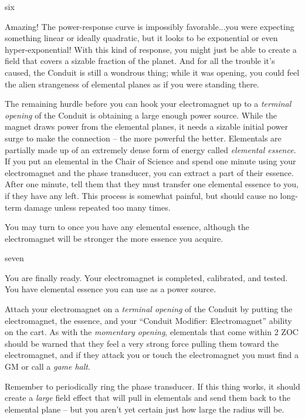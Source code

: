 \documentclass[notebook]{elementals}
\begin{document}
\begin{page}{six}

Amazing! The power-response curve is impossibly favorable...you were expecting something linear or ideally quadratic, but it looks to be exponential or even hyper-exponential! With this kind of response, you might just be able to create a field that covers a sizable fraction of the planet. And for all the trouble it's caused, the Conduit is still a wondrous thing; while it was opening, you could feel the alien strangeness of elemental planes as if you were standing there.

The remaining hurdle before you can hook your electromagnet up to a \emph{terminal opening} of the Conduit is obtaining a large enough power source. While the magnet draws power from the elemental planes, it needs a sizable initial power surge to make the connection -- the more powerful the better. Elementals are partially made up of an extremely dense form of energy called \emph{elemental essence}. If you put an elemental in the Chair of Science and spend one minute using your electromagnet and the phase transducer, you can extract a part of their essence. After one minute, tell them that they must transfer one elemental essence to you, if they have any left. This process is somewhat painful, but should cause no long-term damage unless repeated too many times.

You may turn to  once you have any elemental essence, although the electromagnet will be stronger the more essence you acquire.

\end{page}

\begin{page}{seven}

You are finally ready. Your electromagnet is completed, calibrated, and tested. You have elemental essence you can use as a power source.

Attach your electromagnet on a \emph{terminal opening} of the Conduit by putting the electromagnet, the essence, and your ``Conduit Modifier: Electromagnet'' ability on the cart. As with the \emph{momentary opening}, elementals that come within 2 ZOC should be warned that they feel a very strong force pulling them toward the electromagnet, and if they attack you or touch the electromagnet you must find a GM or call a \emph{game halt}.

Remember to periodically ring the phase transducer. If this thing works, it should create a \emph{large} field effect that will pull in elementals and send them back to the elemental plane -- but you aren't yet certain just how large the radius will be.

\end{page}

\endnotebook
\end{document}
